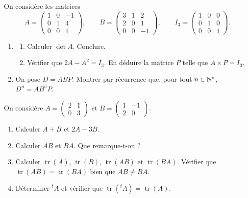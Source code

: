 On considère les matrices
$$
A = \begin{pmatrix}1&0&-1\\0&1&4\\0&0&1\end{pmatrix}, \qquad
B = \begin{pmatrix}3&1&2\\2&0&1\\0&0&-1\end{pmatrix}, \qquad
I_3 = \begin{pmatrix}1&0&0\\0&1&0\\0&0&1\end{pmatrix}.
$$
\begin{enumerate}
	\item
	\begin{enumerate}
		\item Calculer $\det A$. Conclure.
		\item Vérifier que $2A - A^2 = I_3$. En déduire la matrice $P$ telle que
		$A \times P = I_3$.
	\end{enumerate}
	\item On pose $D = ABP$. Montrer par récurrence que, pour tout
	$n \in \mathbb{N}^*$, $D^n = AB^nP$.
\end{enumerate}

On considère $A = \begin{pmatrix}2&1\\0&3\end{pmatrix}$ et
$B = \begin{pmatrix}1&-1\\2&0\end{pmatrix}$.
\begin{enumerate}
	\item Calculer $A + B$ et $2A - 3B$.
	\item Calculer $AB$ et $BA$. Que remarque-t-on ?
	\item Calculer $\operatorname{tr}(A)$, $\operatorname{tr}(B)$,
	$\operatorname{tr}(AB)$ et $\operatorname{tr}(BA)$. Vérifier que
	$\operatorname{tr}(AB) = \operatorname{tr}(BA)$ bien que $AB \neq BA$.
	\item Déterminer ${}^{t}\!A$ et vérifier que
	$\operatorname{tr}({}^{t}\!A) = \operatorname{tr}(A)$.
\end{enumerate}

